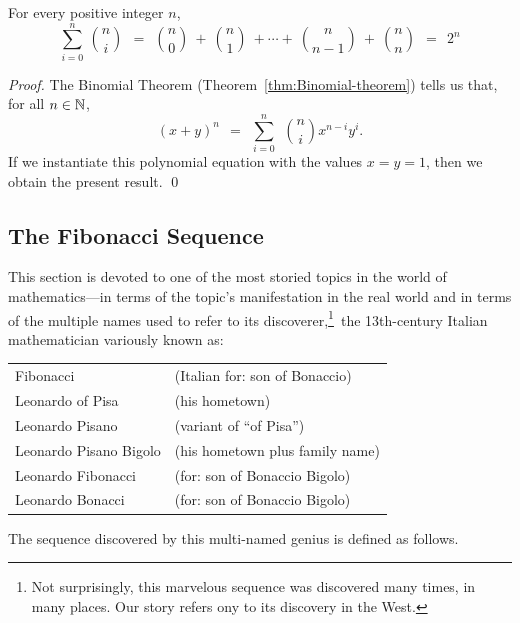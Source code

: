 \begin{prop}
\label{thm:sumsof-binomcoeff}
For every positive integer $n$,
\[
\sum_{i=0}^n \ {n \choose i} \ \ = \ \
{n \choose 0} \ + \ {n \choose 1} \ + \cdots + \ {n \choose {n-1}} \ +
\ {n \choose n} \ \ = \ \ 2^n
\]
\end{prop}

\begin{proof}
The Binomial Theorem (Theorem~\ref{thm:Binomial-theorem}) tells us
that, for all $n \in \mathbb{N}$,
\[
(x+y)^n \ \ = \ \ \sum_{i=0}^n \ \ {n \choose i} x^{n-i} y^i.
\]
If we instantiate this polynomial equation with the values $x = y =
1$, then we obtain the present result.
\qed
\end{proof}


\subsection{The Fibonacci Sequence}
\label{sec:Fibonacci}

This section is devoted to one of the most storied topics in the world
of mathematics---in terms of the topic's manifestation in the real
world and in terms of the multiple names used to refer to its
discoverer,\footnote{Not surprisingly, this marvelous sequence was
  discovered many times, in many places.  Our story refers ony to its
  discovery in the West.}~the 13th-century Italian mathematician
variously known as: \index{Fibonacci, Leonardo}

\begin{tabular}{ll}
Fibonacci               & (Italian for: son of Bonaccio) \\
Leonardo of Pisa        & (his hometown) \\
Leonardo Pisano         & (variant of ``of Pisa'') \\
Leonardo Pisano Bigolo  & (his hometown plus family name) \\
Leonardo Fibonacci      & (for: son of Bonaccio Bigolo) \\
Leonardo Bonacci        & (for: son of Bonaccio Bigolo) \\
\end{tabular}

\medskip

\noindent
The sequence discovered by this multi-named genius is defined as follows.

\medskip

